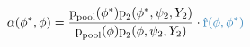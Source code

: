 \begin{equation*}
  \alpha (\phi^{*}, \phi) = 
  \frac {
    \pd_{\text{pool}} (\phi^{*})
    \pd_{2}(\phi^{*}, \psi_{2}, Y_{2})
  } {
    \pd_{\text{pool}} (\phi)
    \pd_{2}(\phi, \psi_{2}, Y_{2})
  }
  \cdot
  \textcolor{mymidblue}{
    \pdrh(\phi, \phi^{*})
  }
\end{equation*}